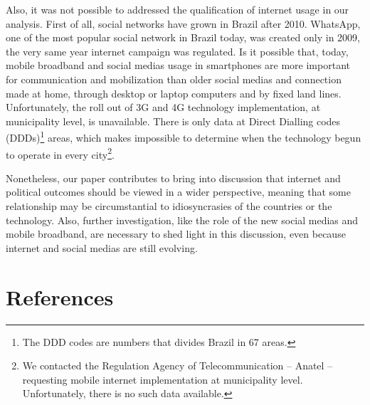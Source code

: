 \documentclass[
  12pt,
]{article}
\begin{document}
Also, it was not possible to addressed the qualification of internet
usage in our analysis. First of all, social networks have grown in
Brazil after 2010. WhatsApp, one of the most popular social network in
Brazil today, was created only in 2009, the very same year internet
campaign was regulated. Is it possible that, today, mobile broadband and
social medias usage in smartphones are more important for communication
and mobilization than older social medias and connection made at home,
through desktop or laptop computers and by fixed land lines.
Unfortunately, the roll out of 3G and 4G technology implementation, at
municipality level, is unavailable. There is only data at Direct
Dialling codes (DDDs)\footnote{The DDD codes are numbers that divides
  Brazil in 67 areas.} areas, which makes impossible to determine when
the technology begun to operate in every city\footnote{We contacted the
  Regulation Agency of Telecommunication -- Anatel -- requesting mobile
  internet implementation at municipality level. Unfortunately, there is
  no such data available.}.

Nonetheless, our paper contributes to bring into discussion that
internet and political outcomes should be viewed in a wider perspective,
meaning that some relationship may be circumstantial to idiosyncrasies
of the countries or the technology. Also, further investigation, like
the role of the new social medias and mobile broadband, are necessary to
shed light in this discussion, even because internet and social medias
are still evolving.

\hypertarget{references}{%
\section*{References}\label{references}}
\end{document}
